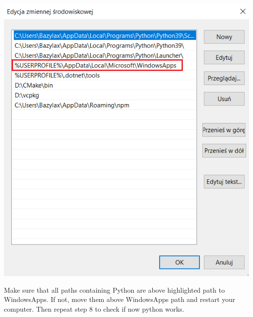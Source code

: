\documentclass[a4paper,12pt]{book}
\begin{document}
\begin{enumerate}
\begin{itemize}
\begin{minipage}[t]{\linewidth}
{				\includegraphics[width=.8\linewidth]{python_install7}%
			}		
			\medskip	
		\end{minipage}
		Make sure that all paths containing Python are above highlighted path to WindowsApps. If not, move them above WindowsApps path and restart your computer. Then repeat step 8 to check if now python works.
	\end{itemize}
\end{enumerate}
\pagebreak
\end{document}
